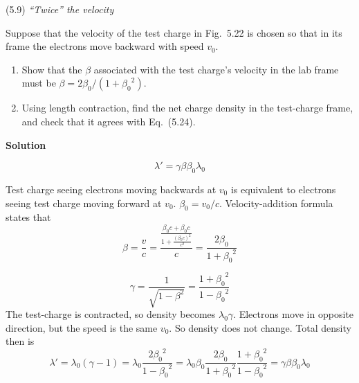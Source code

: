 \documentclass{article}
\begin{document}

\begin{homeworkProblem}
	(5.9) \textit{``Twice'' the velocity}

	Suppose that the velocity of the test charge in Fig.~5.22 is chosen so that in its frame the electrons move backward with speed $v_0$.
	\begin{enumerate}[label=(\alph*)]
		\item Show that the $\beta$ associated with the test charge's velocity in the lab frame must be $\beta=2\beta_0/\left(1+{\beta_0}^2\right)$.
		\item Using length contraction, find the net charge density in the test-charge frame, and check that it agrees with Eq.~(5.24).
	\end{enumerate}

	\textbf{Solution}

	\begin{equation}\tag{5.24}
		\lambda'=\gamma \beta \beta_0 \lambda_0
	\end{equation}
	\begin{enumerate}[label=(\alph*)]
		\begin{item}
			Test charge seeing electrons moving backwards at $v_0$ is equivalent to electrons seeing test charge moving forward at $v_0$. $\beta_0=v_0/c$. Velocity-addition formula states that
			\[
				\beta=\frac{v}{c}=\frac{\frac{\beta_0c+\beta_0c}{1+\frac{(\beta_0c)^2}{c^2}}}{c}=\frac{2\beta_0}{1+{\beta_0}^2}
			\]
		\end{item}
		\begin{item}
			\[
				\gamma=\frac{1}{\sqrt{1-\beta^2}}=\frac{1+{\beta_0}^2}{1-{\beta_0}^2}
			\]
			The test-charge is contracted, so density becomes $\lambda_0 \gamma$. Electrons move in opposite direction, but the speed is the same $v_0$. So density does not change. Total density then is
			\[
				\lambda'=\lambda_0(\gamma-1)=\lambda_0\frac{2{\beta_0}^2}{1-{\beta_0}^2}=\lambda_0\beta_0\frac{2\beta_0}{1+{\beta_0}^2}\frac{1+{\beta_0}^2}{1-{\beta_0}^2}=\gamma \beta \beta_0 \lambda_0
			\]
		\end{item}
	\end{enumerate}
\end{homeworkProblem}

\end{document}
